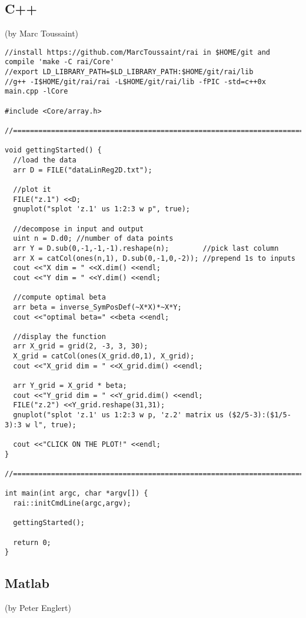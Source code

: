 \subsection*{C++}
(by Marc Toussaint)

\begin{code}
\begin{verbatim}
//install https://github.com/MarcToussaint/rai in $HOME/git and compile 'make -C rai/Core'
//export LD_LIBRARY_PATH=$LD_LIBRARY_PATH:$HOME/git/rai/lib
//g++ -I$HOME/git/rai/rai -L$HOME/git/rai/lib -fPIC -std=c++0x main.cpp -lCore

#include <Core/array.h>

//===========================================================================

void gettingStarted() {
  //load the data
  arr D = FILE("dataLinReg2D.txt");

  //plot it
  FILE("z.1") <<D;
  gnuplot("splot 'z.1' us 1:2:3 w p", true);

  //decompose in input and output
  uint n = D.d0; //number of data points
  arr Y = D.sub(0,-1,-1,-1).reshape(n);        //pick last column
  arr X = catCol(ones(n,1), D.sub(0,-1,0,-2)); //prepend 1s to inputs
  cout <<"X dim = " <<X.dim() <<endl;
  cout <<"Y dim = " <<Y.dim() <<endl;

  //compute optimal beta
  arr beta = inverse_SymPosDef(~X*X)*~X*Y;
  cout <<"optimal beta=" <<beta <<endl;

  //display the function
  arr X_grid = grid(2, -3, 3, 30);
  X_grid = catCol(ones(X_grid.d0,1), X_grid);
  cout <<"X_grid dim = " <<X_grid.dim() <<endl;

  arr Y_grid = X_grid * beta;
  cout <<"Y_grid dim = " <<Y_grid.dim() <<endl;
  FILE("z.2") <<Y_grid.reshape(31,31);
  gnuplot("splot 'z.1' us 1:2:3 w p, 'z.2' matrix us ($2/5-3):($1/5-3):3 w l", true);

  cout <<"CLICK ON THE PLOT!" <<endl;
}

//===========================================================================

int main(int argc, char *argv[]) {
  rai::initCmdLine(argc,argv);

  gettingStarted();
  
  return 0;
}
\end{verbatim}
\end{code}

\subsection*{Matlab}
(by Peter Englert)

